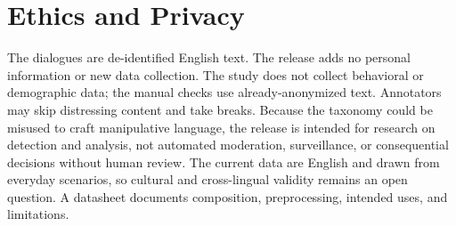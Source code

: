 \documentclass[conference]{IEEEtran}
\begin{document}
\section{Ethics and Privacy}
\label{app:ethics}
The dialogues are de-identified English text. The release adds no personal
information or new data collection. The study
does not collect behavioral or demographic data; the manual checks use
already-anonymized text. Annotators may skip distressing content and take
breaks. Because the taxonomy could be misused to craft manipulative language,
the release is intended for research on detection and analysis, not automated
moderation, surveillance, or consequential decisions without human review.
The current data are English and drawn from everyday scenarios, so cultural
and cross-lingual validity remains an open question. A datasheet documents
composition, preprocessing, intended uses, and limitations.

{\small
\setlength{\itemsep}{1pt}\setlength{\parsep}{0pt}


}
\end{document}
